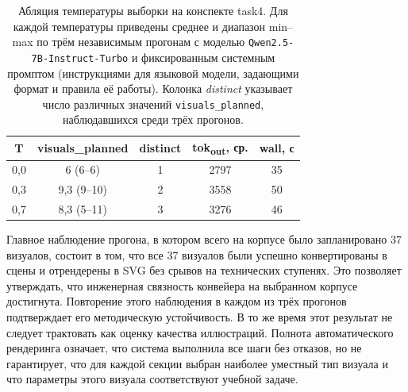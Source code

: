 \begin{table}[htbp]
\centering
\caption{Абляция температуры выборки на конспекте task4. Для каждой температуры приведены среднее и диапазон min--max по трём независимым прогонам с моделью \texttt{Qwen2.5-7B-Instruct-Turbo} и фиксированным системным промптом (инструкциями для языковой модели, задающими формат и правила её работы). Колонка \emph{distinct} указывает число различных значений \texttt{visuals\_planned}, наблюдавшихся среди трёх прогонов.}
\label{tab:ch3:temperature-ablation}
\small
\begin{tabular}{c c c c c}
\toprule
\textbf{T} & \textbf{visuals\_planned} & \textbf{distinct} & \textbf{tok\textsubscript{out}, ср.} & \textbf{wall, с} \\
\midrule
0{,}0 & 6 (6--6)   & 1 & 2797 & 35 \\
0{,}3 & 9{,}3 (9--10) & 2 & 3558 & 50 \\
0{,}7 & 8{,}3 (5--11) & 3 & 3276 & 46 \\
\bottomrule
\end{tabular}
\end{table}

Главное наблюдение прогона, в котором всего на корпусе было запланировано 37 визуалов, состоит в том, что все 37 визуалов были успешно конвертированы в сцены и отрендерены в SVG без срывов на технических ступенях. Это позволяет утверждать, что инженерная связность конвейера на выбранном корпусе достигнута. Повторение этого наблюдения в каждом из трёх прогонов подтверждает его методическую устойчивость. В то же время этот результат не следует трактовать как оценку качества иллюстраций. Полнота автоматического рендеринга означает, что система выполнила все шаги без отказов, но не гарантирует, что для каждой секции выбран наиболее уместный тип визуала и что параметры этого визуала соответствуют учебной задаче.

